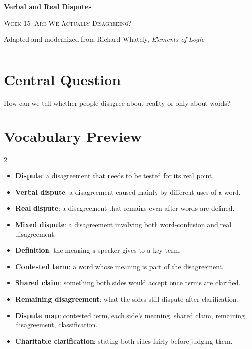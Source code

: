 \documentclass[12pt]{article}
\begin{document}
\begin{center}
{\LARGE\bfseries Verbal and Real Disputes}\par\vspace{0.25em}
{\large\scshape Week 15: Are We Actually Disagreeing?}\par\vspace{0.5em}
{Adapted and modernized from Richard Whately, \textit{Elements of Logic}}\par\vspace{0.6em}
\rule{0.82\textwidth}{0.4pt}
\end{center}

\section*{Central Question}
How can we tell whether people disagree about reality or only about words?

\section*{Vocabulary Preview}
\begin{multicols}{2}
\begin{itemize}[leftmargin=*, itemsep=0.18em]
\item \textbf{Dispute}: a disagreement that needs to be tested for its real point.
\item \textbf{Verbal dispute}: a disagreement caused mainly by different uses of a word.
\item \textbf{Real dispute}: a disagreement that remains even after words are defined.
\item \textbf{Mixed dispute}: a disagreement involving both word-confusion and real disagreement.
\item \textbf{Definition}: the meaning a speaker gives to a key term.
\item \textbf{Contested term}: a word whose meaning is part of the disagreement.
\item \textbf{Shared claim}: something both sides would accept once terms are clarified.
\item \textbf{Remaining disagreement}: what the sides still dispute after clarification.
\item \textbf{Dispute map}: contested term, each side's meaning, shared claim, remaining disagreement, classification.
\item \textbf{Charitable clarification}: stating both sides fairly before judging them.
\end{itemize}
\end{multicols}
\end{document}
